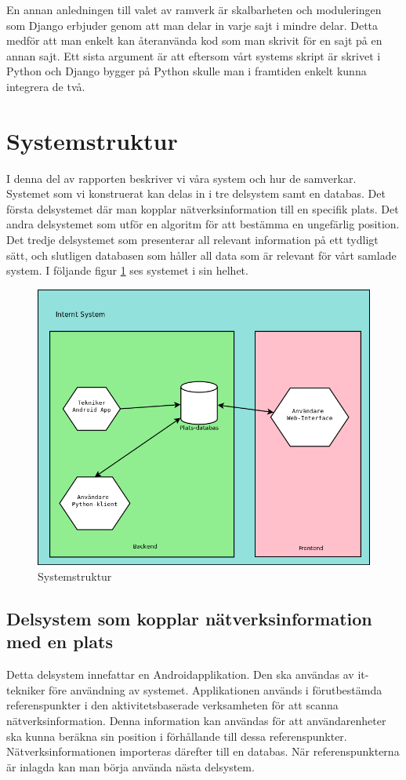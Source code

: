 \documentclass[swedish, a4paper,12pt]{article}
\begin{document}
En annan anledningen till valet av ramverk är skalbarheten och moduleringen som Django erbjuder genom att man delar in varje sajt i mindre delar. Detta medför att man enkelt kan återanvända kod som man skrivit för en sajt på en annan sajt\cite{djangoMVC}. Ett sista argument är att eftersom vårt systems skript är skrivet i Python och Django bygger på Python skulle man i framtiden enkelt kunna integrera de två.

\section{Systemstruktur}
I denna del av rapporten beskriver vi våra system och hur de samverkar.
Systemet som vi konstruerat kan delas in i tre delsystem samt en databas. Det första delsystemet där man kopplar nätverksinformation till en specifik plats. Det andra delsystemet som utför en algoritm för att bestämma en ungefärlig position. Det tredje delsystemet som presenterar all relevant information på ett tydligt sätt, och slutligen databasen som håller all data som är relevant för vårt samlade system.
I följande figur \ref{fig:systemStruktur} ses systemet i sin helhet.

\begin{figure}[H]
	\includegraphics[width=15cm]{media/systemStruktur.png}
	\caption{Systemstruktur}
	\label{fig:systemStruktur}
\end{figure}

\subsection{Delsystem som kopplar nätverksinformation med en plats}
Detta delsystem innefattar en Androidapplikation. Den ska användas av it-tekniker före användning av systemet. Applikationen används i förutbestämda referenspunkter i den aktivitetsbaserade verksamheten för att scanna nätverksinformation. Denna information kan användas för att användarenheter ska kunna beräkna sin position i förhållande till dessa referenspunkter. Nätverksinformationen importeras därefter till en databas. När referenspunkterna är inlagda kan man börja använda nästa delsystem.
\end{document}
